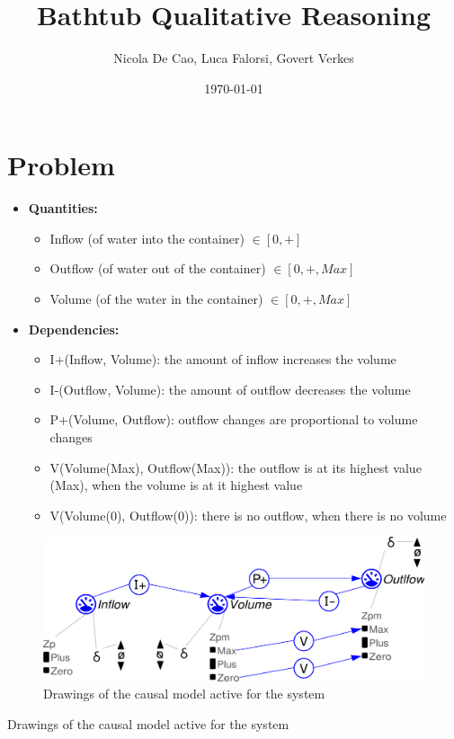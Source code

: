 \documentclass[a4paper]{article}
\title{Bathtub Qualitative Reasoning}
\author{Nicola De Cao, Luca Falorsi, Govert Verkes}
\date{\today}
\begin{document}
\maketitle

\section{Problem}

\begin{itemize}
\item \textbf{Quantities:}
\begin{itemize}
\item Inflow (of water into the container) $\in [0, +]$
\item Outflow (of water out of the container) $\in [0, +, Max]$
\item Volume (of the water in the container) $\in [0, +, Max]$
\end{itemize}

\item \textbf{Dependencies:}

\begin{itemize}
\item I+(Inflow, Volume): the amount of inflow increases the volume
\item I-(Outflow, Volume): the amount of outflow decreases the volume
\item P+(Volume, Outflow): outflow changes are proportional to volume changes
\item V(Volume(Max), Outflow(Max)): the outflow is at its highest value (Max), when the volume is at it highest value
\item V(Volume(0), Outflow(0)): there is no outflow, when there is no volume
\end{itemize}
\end{itemize}


\begin{figure}[H]
\includegraphics[]{problem.png}
\caption{Drawings of the causal model active for the system}
\end{figure}

\begin{algorithm}
\caption{Drawings of the causal model active for the system}
\end{algorithm}
\end{document}
